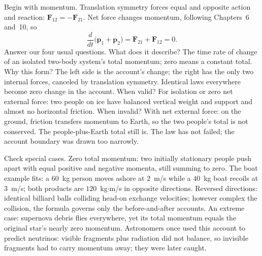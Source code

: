 
Begin with momentum. Translation symmetry forces equal and opposite action and reaction: \(\mathbf F_{12}=-\mathbf F_{21}\). Net force changes momentum, following Chapters~6 and~10, so
\[
\frac{d}{dt}\bigl(\mathbf p_1+\mathbf p_2\bigr)=\mathbf F_{21}+\mathbf F_{12}=0 .
\]
Answer our four usual questions. What does it describe? The time rate of change of an isolated two-body system's total momentum; zero means a constant total. Why this form? The left side is the account's change; the right has the only two internal forces, canceled by translation symmetry. Identical laws everywhere become zero change in the account. When valid? For isolation or zero net external force: two people on ice have balanced vertical weight and support and almost no horizontal friction. When invalid? With net external force: on the ground, friction transfers momentum to Earth, so the two people's total is not conserved. The people-plus-Earth total still is. The law has not failed; the account boundary was drawn too narrowly.

Check special cases. Zero total momentum: two initially stationary people push apart with equal positive and negative momenta, still summing to zero. The boat example fits: a \(60\)~kg person moves ashore at \(2\)~m/s while a \(40\)~kg boat recoils at \(3\)~m/s; both products are \(120\)~kg\(\cdot\)m/s in opposite directions. Reversed directions: identical billiard balls colliding head-on exchange velocities; however complex the collision, the formula governs only the before-and-after accounts. An extreme case: supernova debris flies everywhere, yet its total momentum equals the original star's nearly zero momentum. Astronomers once used this account to predict neutrinos: visible fragments plus radiation did not balance, so invisible fragments had to carry momentum away; they were later caught.

